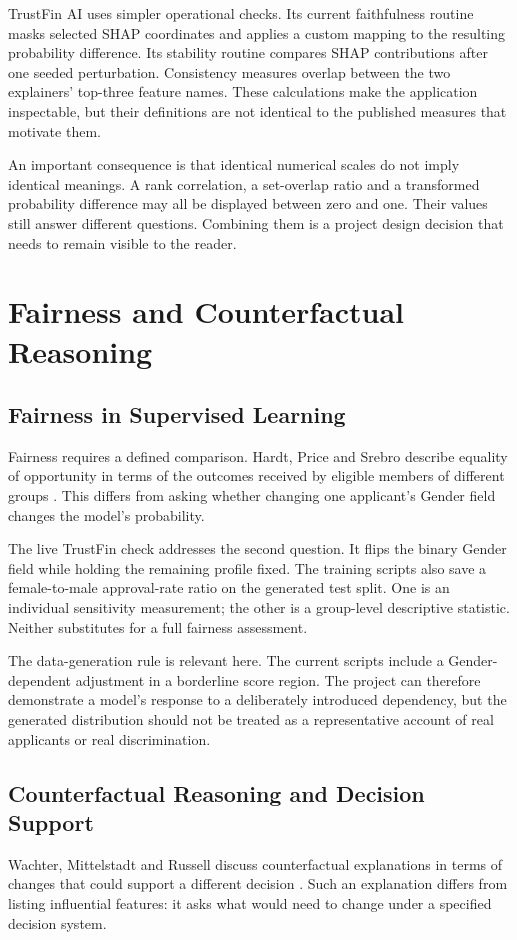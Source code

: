 TrustFin AI uses simpler operational checks. Its current faithfulness routine masks selected SHAP coordinates and applies a custom mapping to the resulting probability difference. Its stability routine compares SHAP contributions after one seeded perturbation. Consistency measures overlap between the two explainers' top-three feature names. These calculations make the application inspectable, but their definitions are not identical to the published measures that motivate them.

An important consequence is that identical numerical scales do not imply identical meanings. A rank correlation, a set-overlap ratio and a transformed probability difference may all be displayed between zero and one. Their values still answer different questions. Combining them is a project design decision that needs to remain visible to the reader.

\section{Fairness and Counterfactual Reasoning}
\subsection{Fairness in Supervised Learning}
Fairness requires a defined comparison. Hardt, Price and Srebro describe equality of opportunity in terms of the outcomes received by eligible members of different groups \cite{hardt2016}. This differs from asking whether changing one applicant's Gender field changes the model's probability.

The live TrustFin check addresses the second question. It flips the binary Gender field while holding the remaining profile fixed. The training scripts also save a female-to-male approval-rate ratio on the generated test split. One is an individual sensitivity measurement; the other is a group-level descriptive statistic. Neither substitutes for a full fairness assessment.

The data-generation rule is relevant here. The current scripts include a Gender-dependent adjustment in a borderline score region. The project can therefore demonstrate a model's response to a deliberately introduced dependency, but the generated distribution should not be treated as a representative account of real applicants or real discrimination.

\subsection{Counterfactual Reasoning and Decision Support}
Wachter, Mittelstadt and Russell discuss counterfactual explanations in terms of changes that could support a different decision \cite{wachter2018}. Such an explanation differs from listing influential features: it asks what would need to change under a specified decision system.

